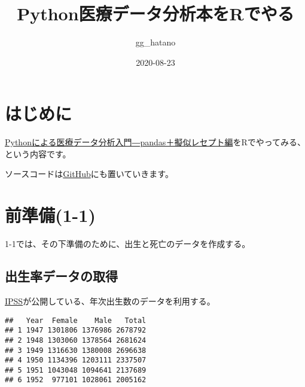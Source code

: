 \documentclass[
]{book}
\title{Python医療データ分析本をRでやる}
\author{gg\_hatano}
\date{2020-08-23}
\newenvironment{Shaded}{\begin{snugshade}}{\end{snugshade}}
\newcommand{\DataTypeTok}[1]{\textcolor[rgb]{0.13,0.29,0.53}{#1}}
\newcommand{\DecValTok}[1]{\textcolor[rgb]{0.00,0.00,0.81}{#1}}
\newcommand{\KeywordTok}[1]{\textcolor[rgb]{0.13,0.29,0.53}{\textbf{#1}}}
\newcommand{\NormalTok}[1]{#1}
\newcommand{\OperatorTok}[1]{\textcolor[rgb]{0.81,0.36,0.00}{\textbf{#1}}}
\newcommand{\OtherTok}[1]{\textcolor[rgb]{0.56,0.35,0.01}{#1}}
\newcommand{\StringTok}[1]{\textcolor[rgb]{0.31,0.60,0.02}{#1}}
\begin{document}
\maketitle

{
\setcounter{tocdepth}{1}
\tableofcontents
}
\hypertarget{ux306fux3058ux3081ux306b}{%
\chapter{はじめに}\label{ux306fux3058ux3081ux306b}}

\href{https://gihyo.jp/book/2020/978-4-297-11517-3}{Pythonによる医療データ分析入門―pandas＋擬似レセプト編}をRでやってみる、という内容です。

ソースコードは\href{https://github.com/gghatano/python_synthetic_medical_data}{GitHub}にも置いていきます。

\hypertarget{ux524dux6e96ux50991-1}{%
\chapter{前準備(1-1)}\label{ux524dux6e96ux50991-1}}

1-1では、その下準備のために、出生と死亡のデータを作成する。

\hypertarget{ux51faux751fux7387ux30c7ux30fcux30bfux306eux53d6ux5f97}{%
\section{出生率データの取得}\label{ux51faux751fux7387ux30c7ux30fcux30bfux306eux53d6ux5f97}}

\href{http://www.ipss.go.jp/}{IPSS}が公開している、年次出生数のデータを利用する。

\begin{Shaded}
\end{Shaded}

\begin{verbatim}
##   Year  Female    Male   Total
## 1 1947 1301806 1376986 2678792
## 2 1948 1303060 1378564 2681624
## 3 1949 1316630 1380008 2696638
## 4 1950 1134396 1203111 2337507
## 5 1951 1043048 1094641 2137689
## 6 1952  977101 1028061 2005162
\end{verbatim}
\end{document}
